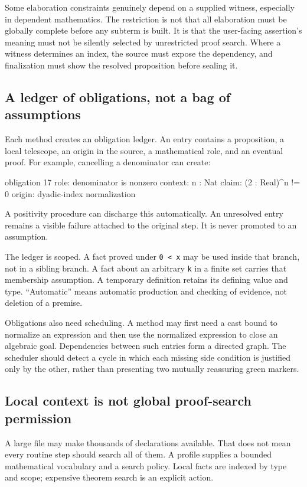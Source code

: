 \documentclass[11pt,a4paper]{article}
\theoremstyle{remark}
\newcommand{\ty}[1]{\texttt{#1}}
\begin{document}
Some elaboration constraints genuinely depend on a supplied witness, especially in dependent mathematics. The restriction is not that all elaboration must be globally complete before any subterm is built. It is that the user-facing assertion's meaning must not be silently selected by unrestricted proof search. Where a witness determines an index, the source must expose the dependency, and finalization must show the resolved proposition before sealing it.

\subsection{A ledger of obligations, not a bag of assumptions}
Each method creates an obligation ledger. An entry contains a proposition, a local telescope, an origin in the source, a mathematical role, and an eventual proof. For example, cancelling a denominator can create:
\Needspace{82pt}
\begin{code}
obligation 17
  role: denominator is nonzero
  context: n : Nat
  claim: (2 : Real)^n != 0
  origin: dyadic-index normalization
\end{code}
A positivity procedure can discharge this automatically. An unresolved entry remains a visible failure attached to the original step. It is never promoted to an assumption.

The ledger is scoped. A fact proved under \ty{0 < x} may be used inside that branch, not in a sibling branch. A fact about an arbitrary \ty{k} in a finite set carries that membership assumption. A temporary definition retains its defining value and type. ``Automatic'' means automatic production and checking of evidence, not deletion of a premise.

Obligations also need scheduling. A method may first need a cast bound to normalize an expression and then use the normalized expression to close an algebraic goal. Dependencies between such entries form a directed graph. The scheduler should detect a cycle in which each missing side condition is justified only by the other, rather than presenting two mutually reassuring green markers.

\subsection{Local context is not global proof-search permission}
A large file may make thousands of declarations available. That does not mean every routine step should search all of them. A profile supplies a bounded mathematical vocabulary and a search policy. Local facts are indexed by type and scope; expensive theorem search is an explicit action.
\end{document}
